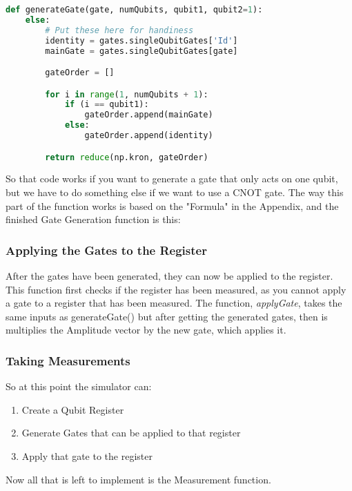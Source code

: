 \documentclass[../main.tex]{subfiles}
\begin{document}
\begin{lstlisting}[language=Python]
def generateGate(gate, numQubits, qubit1, qubit2=1):
    else:
        # Put these here for handiness
        identity = gates.singleQubitGates['Id']
        mainGate = gates.singleQubitGates[gate]

        gateOrder = []

        for i in range(1, numQubits + 1):
            if (i == qubit1):
                gateOrder.append(mainGate)
            else:
                gateOrder.append(identity)

        return reduce(np.kron, gateOrder)
\end{lstlisting}

So that code works if you want to generate a gate that only acts on one qubit,
but we have to do something else if we want to use a CNOT gate.
The way this part of the function works is based on the "Formula" in the Appendix,
and the finished Gate Generation function is this:



\subsubsection{Applying the Gates to the Register}

After the gates have been generated, they can now be applied to the register.
This function first checks if the register has been measured, as you cannot apply a gate to a register that has been measured.
The function, \emph{applyGate}, takes the same inputs as generateGate() but after getting the generated gates, then is multiplies the Amplitude vector by the new gate, which applies it. 



\subsubsection{Taking Measurements}
So at this point the simulator can:
 \begin{enumerate}
   \item Create a Qubit Register
   \item Generate Gates that can be applied to that register
   \item Apply that gate to the register
 \end{enumerate}
Now all that is left to implement is the Measurement function.
\end{document}
